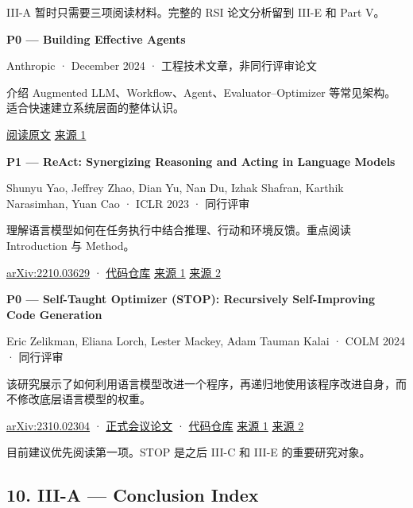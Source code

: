 III-A 暂时只需要三项阅读材料。完整的 RSI 论文分析留到 III-E 和 Part V。

\textbf{P0 --- Building Effective Agents}

Anthropic · December 2024 · 工程技术文章，非同行评审论文

介绍 Augmented LLM、Workflow、Agent、Evaluator--Optimizer 等常见架构。适合快速建立系统层面的整体认识。

\href{https://www.anthropic.com/research/building-effective-agents}{阅读原文} \href{https://www.anthropic.com/research/building-effective-agents?hsLang=en}{来源 1}

\textbf{P1 --- ReAct: Synergizing Reasoning and Acting in Language Models}

Shunyu Yao, Jeffrey Zhao, Dian Yu, Nan Du, Izhak Shafran, Karthik Narasimhan, Yuan Cao · ICLR 2023 · 同行评审

理解语言模型如何在任务执行中结合推理、行动和环境反馈。重点阅读 Introduction 与 Method。

\href{https://arxiv.org/abs/2210.03629}{arXiv:2210.03629} · \href{https://github.com/ysymyth/ReAct}{代码仓库} \href{https://arxiv.org/abs/2210.03629}{来源 1} \href{https://github.com/ysymyth/ReAct}{来源 2}

\textbf{P0 --- Self-Taught Optimizer (STOP): Recursively Self-Improving Code Generation}

Eric Zelikman, Eliana Lorch, Lester Mackey, Adam Tauman Kalai · COLM 2024 · 同行评审

该研究展示了如何利用语言模型改进一个程序，再递归地使用该程序改进自身，而不修改底层语言模型的权重。

\href{https://arxiv.org/abs/2310.02304}{arXiv:2310.02304} · \href{https://proceedings.colm.cc/paper_files/paper/2024/hash/52eb24c316c78cc144dfa54f1f4bb4ec-Abstract-Conference.html}{正式会议论文} · \href{https://github.com/microsoft/STOP}{代码仓库} \href{https://proceedings.colm.cc/paper_files/paper/2024/hash/52eb24c316c78cc144dfa54f1f4bb4ec-Abstract-Conference.html}{来源 1} \href{https://github.com/microsoft/STOP}{来源 2}

目前建议优先阅读第一项。STOP 是之后 III-C 和 III-E 的重要研究对象。

\hypertarget{part-3-31-0001-iii-a-conclusion-index}{%
\subsection{10. III-A --- Conclusion Index}\label{part-3-31-0001-iii-a-conclusion-index}}

